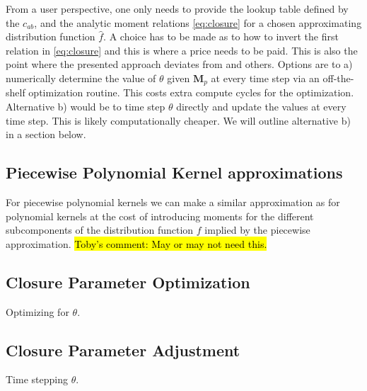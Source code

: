 \documentclass{report}
\begin{document}
From a user perspective, one only needs to provide the lookup table defined by the $c_{ab}$, and the analytic moment relations \eqref{eq:closure} for a chosen approximating distribution function $\hat{f}$. A choice has to be made as to how to invert the first relation in \eqref{eq:closure} and this is where a price needs to be paid. This is also the point where the presented approach deviates from \cite{Beheng01} and others. Options are to a) numerically determine the value of $\theta$ given $\mathbf{M}_p$ at every time step via an off-the-shelf optimization routine. This costs extra compute cycles for the optimization. Alternative b) would be to time step $\theta$ directly and update the values at every time step. This is likely computationally cheaper. We will outline alternative b) in a section below.

\subsection{Piecewise Polynomial Kernel approximations}
For piecewise polynomial kernels we can make a similar approximation as for polynomial kernels at the cost of introducing moments for the different subcomponents of the distribution function $f$ implied by the piecewise approximation. \hl{Toby's comment: May or may not need this.}

\subsection{Closure Parameter Optimization}
Optimizing for $\theta$.

\subsection{Closure Parameter Adjustment}
Time stepping $\theta$.

\end{document}
